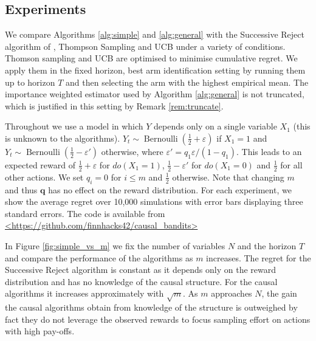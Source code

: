 \documentclass[11pt,a4paper,oneside]{book}
\newcommand{\bernoulli}{\operatorname{Bernoulli}}
\theoremstyle{plain}
\theoremstyle{definition}
\let\epsilon\varepsilon
\begin{document}
\subsection{Experiments}
We compare Algorithms \ref{alg:simple} and \ref{alg:general} with the Successive Reject algorithm of \citet{Audibert2010}, Thompson Sampling and UCB under a variety of conditions. Thomson sampling and UCB are optimised to minimise cumulative regret. We apply them in the fixed horizon, best arm identification setting by running them up to horizon $T$ and then selecting the arm with the highest empirical mean. The importance weighted estimator used by Algorithm \ref{alg:general} is not truncated, which is justified in this setting by Remark \ref{rem:truncate}. 

Throughout we use a model in which $Y$ depends only on a single variable $X_1$ (this is unknown to the algorithms). $Y_t \sim \bernoulli(\frac{1}{2}+\epsilon)$ if $X_1=1$ and $Y_t \sim \bernoulli(\frac{1}{2}-\epsilon')$ otherwise, where $\epsilon' = q_1\epsilon/(1-q_1)$. This leads to an expected reward of $\frac{1}{2}+\epsilon$ for $do(X_1=1)$, $\frac{1}{2}-\epsilon'$ for $do(X_1=0)$ and $\frac{1}{2}$ for all other actions. We set $q_i = 0$ for $i \leq m$ and $\frac{1}{2}$ otherwise. Note that changing $m$ and thus $\boldsymbol{q}$ has no effect on the reward distribution. For each experiment, we show the average regret over 10,000 simulations with error bars displaying three standard errors. The code is available from \url{<https://github.com/finnhacks42/causal_bandits>} 

In Figure \ref{fig:simple_vs_m} we fix the number of variables $N$ and the horizon $T$ and compare the performance of the algorithms as $m$ increases. The regret for the Successive Reject algorithm is constant as it depends only on the reward distribution and has no knowledge of the causal structure. For the causal algorithms it increases approximately with $\sqrt{m}$. As $m$ approaches $N$, the gain the causal algorithms obtain from knowledge of the structure is outweighed by fact they do not leverage the observed rewards to focus sampling effort on actions with high pay-offs.
\end{document}
